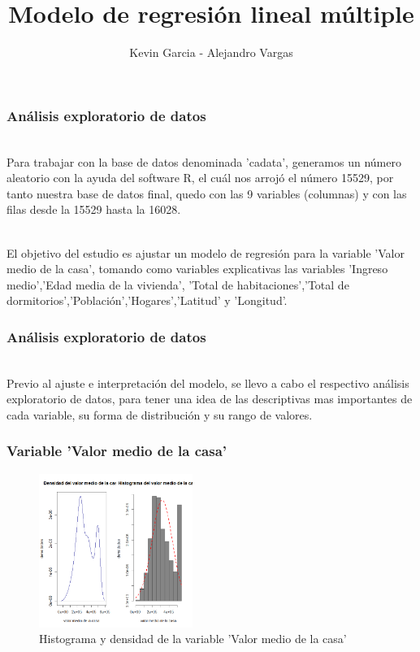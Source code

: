 \documentclass[12pt]{beamer}
\author{Kevin Garcia - Alejandro Vargas}
\title{Modelo de regresión lineal múltiple}
\begin{document}
\begin{frame}
\titlepage
\end{frame}


\begin{frame}
\frametitle{Análisis exploratorio de datos}
~\\ Para trabajar con la base de datos denominada 'cadata', generamos un número aleatorio con la ayuda del software R, el cuál nos arrojó el número 15529, por tanto nuestra base de datos final, quedo con las 9 variables (columnas) y con las filas desde la 15529 hasta la 16028.

~\\ El objetivo del estudio es ajustar un modelo de regresión para la variable 'Valor medio de la casa', tomando como variables explicativas las variables 'Ingreso medio','Edad media de la vivienda', 'Total de habitaciones','Total de dormitorios','Población','Hogares','Latitud' y 'Longitud'. 
\end{frame}

\begin{frame}
\frametitle{Análisis exploratorio de datos}
~\\ Previo al ajuste e interpretación del modelo, se llevo a cabo el respectivo análisis exploratorio de datos, para tener una idea de las descriptivas mas importantes de cada variable, su forma de distribución y su rango de valores.

\end{frame}

\begin{frame}
\frametitle{Variable 'Valor medio de la casa'}
\begin{figure}[!h]
    \begin{center}
        \includegraphics[width=5cm]{imagenes/1.png}
        \caption{Histograma y densidad de la variable 'Valor medio de la casa'}
        \label{fig:Densidad}
    \end{center}
\end{figure}
\end{frame}
\end{document}
